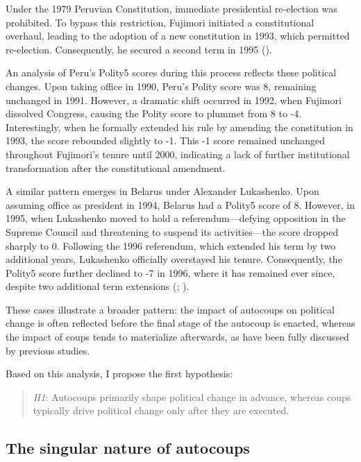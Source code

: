 \documentclass[
  12pt,
]{report}
\begin{document}
Under the 1979 Peruvian Constitution, immediate presidential re-election
was prohibited. To bypass this restriction, Fujimori initiated a
constitutional overhaul, leading to the adoption of a new constitution
in 1993, which permitted re-election. Consequently, he secured a second
term in 1995 ().

An analysis of Peru's Polity5 scores during this process reflects these
political changes. Upon taking office in 1990, Peru's Polity score was
8, remaining unchanged in 1991. However, a dramatic shift occurred in
1992, when Fujimori dissolved Congress, causing the Polity score to
plummet from 8 to -4. Interestingly, when he formally extended his rule
by amending the constitution in 1993, the score rebounded slightly to
-1. This -1 score remained unchanged throughout Fujimori's tenure until
2000, indicating a lack of further institutional transformation after
the constitutional amendment.

A similar pattern emerges in Belarus under Alexander Lukashenko. Upon
assuming office as president in 1994, Belarus had a Polity5 score of 8.
However, in 1995, when Lukashenko moved to hold a referendum---defying
opposition in the Supreme Council and threatening to suspend its
activities---the score dropped sharply to 0. Following the 1996
referendum, which extended his term by two additional years, Lukashenko
officially overstayed his tenure. Consequently, the Polity5 score
further declined to -7 in 1996, where it has remained ever since,
despite two additional term extensions (; ).

These cases illustrate a broader pattern: the impact of autocoups on
political change is often reflected before the final stage of the
autocoup is enacted, whereas the impact of coups tends to materialize
afterwards, as have been fully discussed by previous studies.

Based on this analysis, I propose the first hypothesis:

\begin{quote}
\emph{H1}: Autocoups primarily shape political change in advance,
whereas coups typically drive political change only after they are
executed.
\end{quote}

\subsection{\texorpdfstring{\textbf{The singular nature of
autocoups}}{The singular nature of autocoups}}\label{the-singular-nature-of-autocoups}
\end{document}
